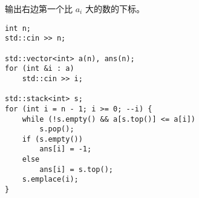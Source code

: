 输出右边第一个比 $a_i$ 大的数的下标。
\begin{lstlisting}
int n;
std::cin >> n;

std::vector<int> a(n), ans(n);
for (int &i : a)
	std::cin >> i;

std::stack<int> s;
for (int i = n - 1; i >= 0; --i) {
	while (!s.empty() && a[s.top()] <= a[i]) 
		s.pop();
	if (s.empty()) 
		ans[i] = -1;
	else
		ans[i] = s.top();
	s.emplace(i);
}
\end{lstlisting}